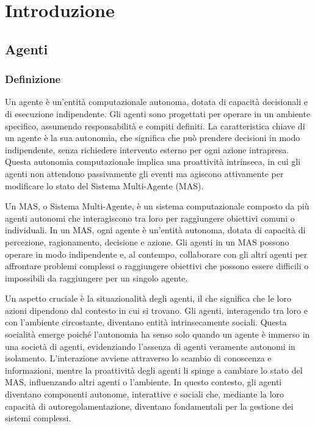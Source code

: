 \section{Introduzione}

\subsection{Agenti}

\subsubsection{Definizione}
Un agente è un'entità computazionale autonoma, dotata di capacità decisionali e di esecuzione indipendente. Gli agenti sono progettati per operare in un ambiente specifico, assumendo responsabilità e compiti definiti. La caratteristica chiave di un agente è la sua autonomia, che significa che può prendere decisioni in modo indipendente, senza richiedere intervento esterno per ogni azione intrapresa. Questa autonomia computazionale implica una proattività intrinseca, in cui gli agenti non attendono passivamente gli eventi ma agiscono attivamente per modificare lo stato del Sistema Multi-Agente (MAS).

Un MAS, o Sistema Multi-Agente, è un sistema computazionale composto da più agenti autonomi che interagiscono tra loro per raggiungere obiettivi comuni o individuali. In un MAS, ogni agente è un'entità autonoma, dotata di capacità di percezione, ragionamento, decisione e azione. Gli agenti in un MAS possono operare in modo indipendente e, al contempo, collaborare con gli altri agenti per affrontare problemi complessi o raggiungere obiettivi che possono essere difficili o impossibili da raggiungere per un singolo agente.

Un aspetto cruciale è la situazionalità degli agenti, il che significa che le loro azioni dipendono dal contesto in cui si trovano. Gli agenti, interagendo tra loro e con l'ambiente circostante, diventano entità intrinsecamente sociali. Questa socialità emerge poiché l'autonomia ha senso solo quando un agente è immerso in una società di agenti, evidenziando l'assenza di agenti veramente autonomi in isolamento. L'interazione avviene attraverso lo scambio di conoscenza e informazioni, mentre la proattività degli agenti li spinge a cambiare lo stato del MAS, influenzando altri agenti o l'ambiente. In questo contesto, gli agenti diventano componenti autonome, interattive e sociali che, mediante la loro capacità di autoregolamentazione, diventano fondamentali per la gestione dei sistemi complessi.

